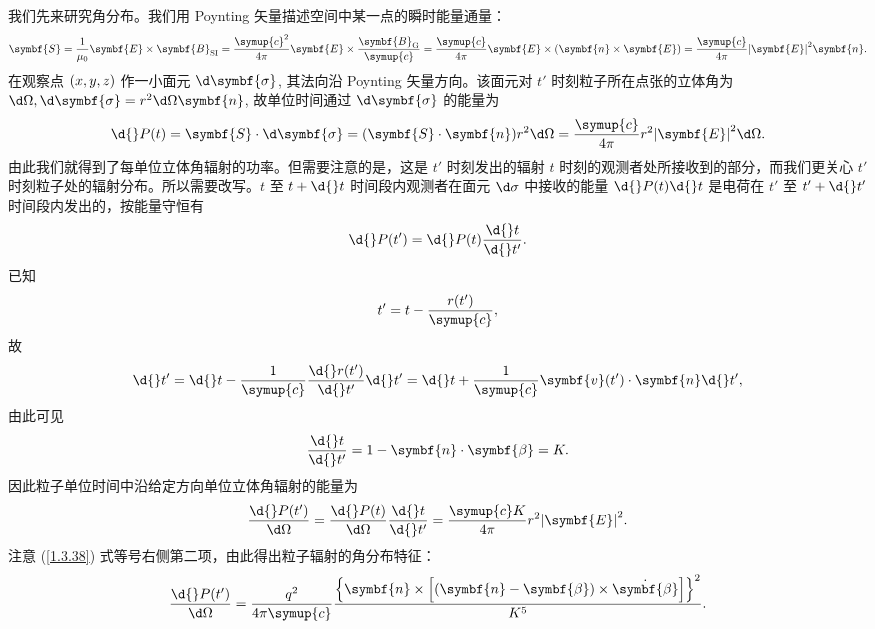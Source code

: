 \documentclass[../天体物理基础.tex]{subfiles}
\begin{document}
我们先来研究角分布。我们用 Poynting 矢量描述空间中某一点的瞬时能量通量：
\begin{equation}
\symbf{S}=\frac{1}{\mu_{0}}\symbf{E}\times\symbf{B}_{\mathrm{SI}}=\frac{\symup{c}^{2}}{4\pi}\symbf{E}\times\frac{\symbf{B}_{\mathrm{G}}}{\symup{c}}=\frac{\symup{c}}{4\pi}\symbf{E}\times\mleft(\symbf{n}\times\symbf{E}\mright)=\frac{\symup{c}}{4\pi}\mleft\vert\symbf{E}\mright\vert^{2}\symbf{n}.
\end{equation}
在观察点 $\mleft(x, y, z\mright)$ 作一小面元 $\d\symbf{\sigma}$, 其法向沿 Poynting 矢量方向。该面元对 $t'$ 时刻粒子所在点张的立体角为 $\d\Omega,\d\symbf{\sigma}=r^{2}\d\Omega\symbf{n}$, 故单位时间通过 $\d\symbf{\sigma}$ 的能量为
\begin{equation}
\d{}P\mleft(t\mright)=\symbf{S}\cdot\d\symbf{\sigma}=\mleft(\symbf{S}\cdot\symbf{n}\mright) r^{2}\d\Omega=\frac{\symup{c}}{4\pi}r^{2}\mleft\vert\symbf{E}\mright\vert^{2}\d\Omega.
\end{equation}
由此我们就得到了每单位立体角辐射的功率。但需要注意的是，这是 $t'$ 时刻发出的辐射 $t$ 时刻的观测者处所接收到的部分，而我们更关心 $t'$ 时刻粒子处的辐射分布。所以需要改写。$t$ 至 $t+\d{}t$ 时间段内观测者在面元 $\d\sigma$ 中接收的能量 $\d{}P\mleft(t\mright)\d{}t$ 是电荷在 $t'$ 至 $t'+\d{}t'$ 时间段内发出的，按能量守恒有
\begin{equation}
\d{}P\mleft(t'\mright)=\d{}P\mleft(t\mright)\frac{\d{}t}{\d{}t'}.
\end{equation}
已知
\begin{equation}
t'=t-\frac{r\mleft(t'\mright)}{\symup{c}},
\end{equation}
故
\begin{equation}
\d{}t'=\d{}t-\frac{1}{\symup{c}}\frac{\d{}r\mleft(t'\mright)}{\d{}t'}\d{}t'=\d{}t+\frac{1}{\symup{c}}\symbf{v}\mleft(t'\mright)\cdot\symbf{n}\d{}t',
\end{equation}
由此可见
\begin{equation}
\frac{\d{}t}{\d{}t'}=1-\symbf{n}\cdot\symbf{\beta}=K.
\end{equation}
因此粒子单位时间中沿给定方向单位立体角辐射的能量为
\begin{equation}
\frac{\d{}P\mleft(t'\mright)}{\d\Omega}=\frac{\d{}P\mleft(t\mright)}{\d\Omega}\frac{\d{}t}{\d{}t'}=\frac{\symup{c}K}{4\pi}r^{2}\mleft\vert\symbf{E}\mright\vert^{2}.
\end{equation}
注意 (\ref{1.3.38}) 式等号右侧第二项，由此得出粒子辐射的角分布特征：
\begin{equation}
\frac{\d{}P\mleft(t'\mright)}{\d\Omega}=\frac{q^{2}}{4\pi\symup{c}}\frac{\mleft\{\symbf{n}\times\mleft[\mleft(\symbf{n}-\symbf{\beta}\mright)\times\dot{\symbf{\beta}}\mright]\mright\}^{2}}{K^{5}}.\label{1.3.46}
\end{equation}
\end{document}

